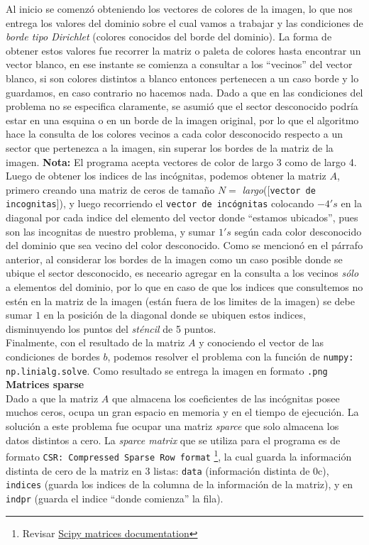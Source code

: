 \documentclass[letterpaper,10.7pt]{article}
\begin{document}
Al inicio se comenzó obteniendo los vectores de colores de la imagen, lo que nos entrega los valores del dominio sobre el cual vamos a trabajar y las condiciones de \textit{borde tipo Dirichlet} (colores conocidos del borde del dominio). La forma de obtener estos valores fue recorrer la matriz o paleta de colores hasta encontrar un vector blanco, en ese instante se comienza a consultar a los ``vecinos'' del vector blanco, si son colores distintos a blanco entonces pertenecen a un caso borde y lo guardamos, en caso contrario no hacemos nada. Dado a que en las condiciones del problema no se especifica claramente, se asumió que el sector desconocido podría estar en una esquina o en un borde de la imagen original, por lo que el algoritmo hace la consulta de los colores vecinos a cada color desconocido respecto a un sector que pertenezca a la imagen, sin superar los bordes de la matriz de la imagen. 
\textbf{Nota:} El programa acepta vectores de color de largo 3 como de largo 4. \\

Luego de obtener los indices de las incógnitas, podemos obtener la matriz $A$, primero creando una matriz de ceros de tamaño $N =$ \textit{largo}([\texttt{vector de incognitas}]), y luego recorriendo el \texttt{vector de incógnitas} colocando $-4's$ en la diagonal por cada indice del elemento del vector donde ``estamos ubicados'', pues son las incognitas de nuestro problema, y sumar $1's$ según cada color desconocido del dominio que sea vecino del color desconocido. Como se mencionó en el párrafo anterior, al considerar los bordes de la imagen como un caso posible donde se ubique el sector desconocido, es neceario agregar en la consulta a los vecinos \textit{sólo} a elementos del dominio, por lo que en caso de que los indices que consultemos no estén en la matriz de la imagen (están fuera de los limites de la imagen) se debe sumar $1$ en la posición de la diagonal donde se ubiquen estos indices, disminuyendo los puntos del \textit{sténcil} de 5 puntos. \\

Finalmente, con el resultado de la matriz $A$ y conociendo el vector de las condiciones de bordes $b$, podemos resolver el problema con la función de \texttt{numpy:} \texttt{np.linialg.solve}. Como resultado se entrega la imagen en formato \texttt{.png}\\

{\centering \textbf{{\Large Matrices sparse}}}\\

Dado a que la matriz $A$ que almacena los coeficientes de las incógnitas posee muchos ceros, ocupa un gran espacio en memoria y en el tiempo de ejecución.
La solución a este problema fue ocupar una matriz \textit{sparce} que solo almacena los datos distintos a cero. La \textit{sparce matrix} que se utiliza para el programa es de formato \texttt{CSR: Compressed Sparse Row format} \footnote{Revisar \href{https://docs.scipy.org/doc/scipy/reference/sparse.html}{Scipy matrices documentation}}, la cual guarda la información distinta de cero de la matriz en 3 listas: \texttt{data} (información distinta de 0c), \texttt{indices} (guarda los indices de la columna de la información de la matriz), y en \texttt{indpr} (guarda el indice ``donde comienza'' la fila).
\end{document}
